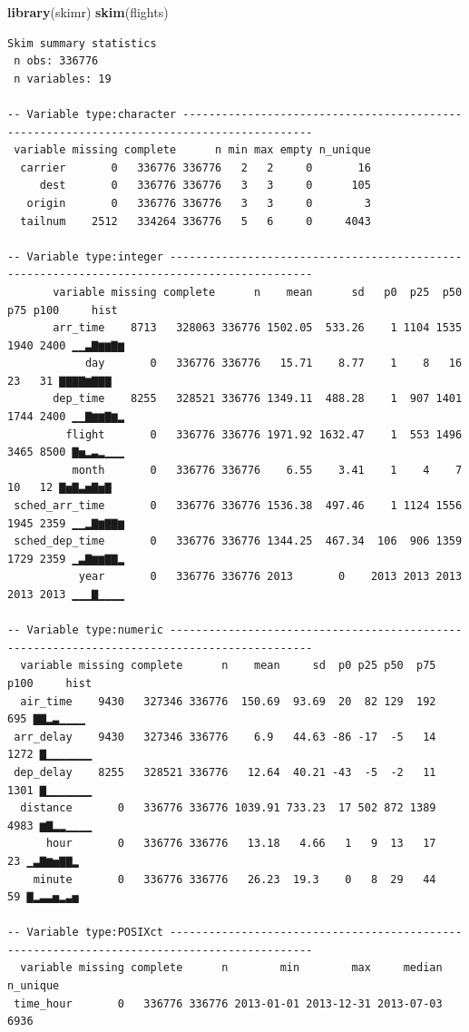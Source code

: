 \documentclass[a4paperpaper,]{article}
\newenvironment{Shaded}{\begin{snugshade}}{\end{snugshade}}
\newcommand{\KeywordTok}[1]{\textcolor[rgb]{0.12,0.11,0.11}{\textbf{#1}}}
\newcommand{\NormalTok}[1]{\textcolor[rgb]{0.12,0.11,0.11}{#1}}
\begin{document}
\begin{Shaded}
\begin{Highlighting}[]
\KeywordTok{library}\NormalTok{(skimr)}
\KeywordTok{skim}\NormalTok{(flights)}
\end{Highlighting}
\end{Shaded}

\begin{verbatim}
Skim summary statistics
 n obs: 336776 
 n variables: 19 

-- Variable type:character ------------------------------------------------------------------------------------------
 variable missing complete      n min max empty n_unique
  carrier       0   336776 336776   2   2     0       16
     dest       0   336776 336776   3   3     0      105
   origin       0   336776 336776   3   3     0        3
  tailnum    2512   334264 336776   5   6     0     4043

-- Variable type:integer --------------------------------------------------------------------------------------------
       variable missing complete      n    mean      sd   p0  p25  p50  p75 p100     hist
       arr_time    8713   328063 336776 1502.05  533.26    1 1104 1535 1940 2400 ▁▁▃▇▆▆▇▆
            day       0   336776 336776   15.71    8.77    1    8   16   23   31 ▇▇▇▇▆▇▇▇
       dep_time    8255   328521 336776 1349.11  488.28    1  907 1401 1744 2400 ▁▁▇▆▆▇▆▂
         flight       0   336776 336776 1971.92 1632.47    1  553 1496 3465 8500 ▇▅▂▃▂▁▁▁
          month       0   336776 336776    6.55    3.41    1    4    7   10   12 ▇▅▇▃▅▇▅▇
 sched_arr_time       0   336776 336776 1536.38  497.46    1 1124 1556 1945 2359 ▁▁▂▇▆▇▇▆
 sched_dep_time       0   336776 336776 1344.25  467.34  106  906 1359 1729 2359 ▁▃▇▆▆▇▇▂
           year       0   336776 336776 2013       0    2013 2013 2013 2013 2013 ▁▁▁▇▁▁▁▁

-- Variable type:numeric --------------------------------------------------------------------------------------------
  variable missing complete      n    mean     sd  p0 p25 p50  p75 p100     hist
  air_time    9430   327346 336776  150.69  93.69  20  82 129  192  695 ▇▇▂▃▁▁▁▁
 arr_delay    9430   327346 336776    6.9   44.63 -86 -17  -5   14 1272 ▇▁▁▁▁▁▁▁
 dep_delay    8255   328521 336776   12.64  40.21 -43  -5  -2   11 1301 ▇▁▁▁▁▁▁▁
  distance       0   336776 336776 1039.91 733.23  17 502 872 1389 4983 ▆▇▂▂▁▁▁▁
      hour       0   336776 336776   13.18   4.66   1   9  13   17   23 ▁▃▇▆▅▇▇▂
    minute       0   336776 336776   26.23  19.3    0   8  29   44   59 ▇▂▃▃▅▂▃▅

-- Variable type:POSIXct --------------------------------------------------------------------------------------------
  variable missing complete      n        min        max     median n_unique
 time_hour       0   336776 336776 2013-01-01 2013-12-31 2013-07-03     6936
\end{verbatim}
\end{document}
